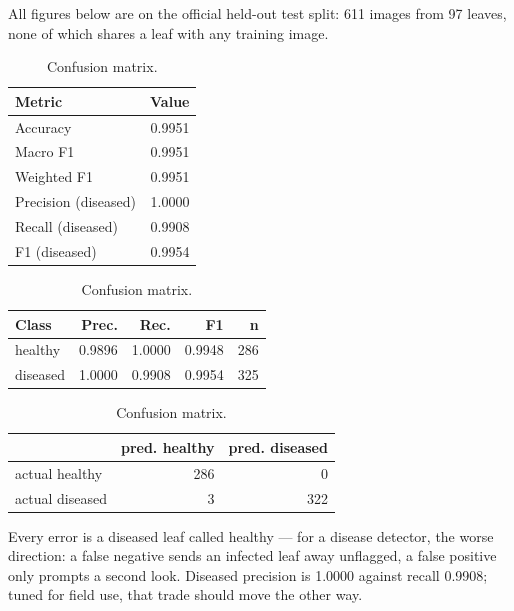 \documentclass[10pt,a4paper]{article}
\begin{document}
All figures below are on the official held-out test split: 611 images from 97 leaves,
none of which shares a leaf with any training image.

\begin{table}[H]
\centering\small
\begin{minipage}[t]{0.46\textwidth}
\centering
\caption{Headline test metrics.}
\begin{tabular}{lr}
\toprule
\textbf{Metric} & \textbf{Value} \\
\midrule
Accuracy              & 0.9951 \\
Macro F1              & 0.9951 \\
Weighted F1           & 0.9951 \\
Precision (diseased)  & 1.0000 \\
Recall (diseased)     & 0.9908 \\
F1 (diseased)         & 0.9954 \\
\bottomrule
\end{tabular}
\end{minipage}\hfill
\begin{minipage}[t]{0.5\textwidth}
\centering
\caption{Per-class results.}
\begin{tabular}{lrrrr}
\toprule
\textbf{Class} & \textbf{Prec.} & \textbf{Rec.} & \textbf{F1} & \textbf{n} \\
\midrule
healthy  & 0.9896 & 1.0000 & 0.9948 & 286 \\
diseased & 1.0000 & 0.9908 & 0.9954 & 325 \\
\bottomrule
\end{tabular}
\vspace{0.6em}
\caption{Confusion matrix.}
\begin{tabular}{lrr}
\toprule
& \textbf{pred. healthy} & \textbf{pred. diseased} \\
\midrule
actual healthy  & 286 & 0 \\
actual diseased & 3   & 322 \\
\bottomrule
\end{tabular}
\end{minipage}
\end{table}

Every error is a diseased leaf called healthy --- for a disease detector, the worse
direction: a false negative sends an infected leaf away unflagged, a false positive only
prompts a second look. Diseased precision is 1.0000 against recall 0.9908; tuned for
field use, that trade should move the other way.
\end{document}
